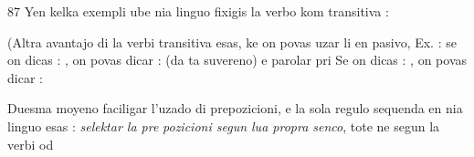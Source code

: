 \begin{VUpage}[91]{87}
Yen kelka exempli ube nia linguo fixigis la verbo kom\nl
transitiva : 

(Altra avantajo di la verbi transitiva esas, ke on povas\nl
uzar li en pasivo, Ex. : se on dicas : , on\nl
povas dicar :  (da ta suvereno) e parolar pri\nl
{} Se on dicas : , on\nl
povas dicar : 

Duesma moyeno faciligar l'uzado di prepozicioni, e la\nl
sola regulo sequenda en nia linguo esas : \textit{selektar la pre}\cc
\textit{pozicioni segun lua propra senco}, tote ne segun la verbi od\parplein
\end{VUpage}

